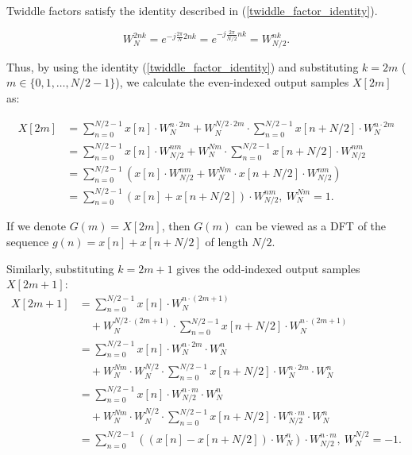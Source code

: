 \documentclass[a4paper,12pt, master]{etf}
\begin{document}
Twiddle factors satisfy the identity described in (\ref{twiddle_factor_identity}).

\begin{equation}
    W_N^{2nk} = e^{-j \frac{2\pi}{N} 2nk} = e^{-j \frac{2\pi}{N/2} nk} = W_{N/2}^{nk}.
\label{twiddle_factor_identity}
\end{equation}

Thus, by using the identity (\ref{twiddle_factor_identity}) and substituting $k=2m$ ($m \in \{0, 1, \ldots, N/2-1\}$), we calculate the even-indexed output samples $X[2m]$ as:

\begin{equation}
\begin{split}
    X[2m] &= \sum_{n=0}^{N/2-1} x[n] \cdot W_N^{n\cdot2m} + W_N^{N/2 \cdot 2m}\cdot\sum_{n=0}^{N/2-1} x[n + N/2] \cdot W_N^{n \cdot 2m} \\
    &= \sum_{n=0}^{N/2-1} x[n] \cdot W_{N/2}^{nm} + W_N^{Nm}\cdot\sum_{n=0}^{N/2-1} x[n + N/2] \cdot W_{N/2}^{nm} \\
    &= \sum_{n=0}^{N/2-1} (x[n] \cdot W_{N/2}^{nm} + W_N^{Nm}\cdot x[n + N/2] \cdot W_{N/2}^{nm}) \\
    &= \sum_{n=0}^{N/2-1} (x[n] + x[n + N/2]) \cdot W_{N/2}^{nm}, \ W_N^{Nm} = 1.
\label{dft_radix2_1}
\end{split}
\end{equation}

If we denote $G(m) = X[2m]$, then $G(m)$ can be viewed as a DFT of the sequence $g(n) = x[n] + x[n + N/2]$ of length $N/2$.

Similarly, substituting $k=2m+1$ gives the odd-indexed output samples $X[2m+1]$:
\begin{equation}
\begin{split}
    X[2m+1] &= \sum_{n=0}^{N/2-1} x[n] \cdot W_N^{n\cdot(2m+1)} \\
    &\quad + W_N^{N/2 \cdot (2m+1)}\cdot\sum_{n=0}^{N/2-1} x[n + N/2] \cdot W_N^{n \cdot (2m+1)} \\
    &= \sum_{n=0}^{N/2-1} x[n] \cdot W_{N}^{n\cdot2m} \cdot W_{N}^{n} \\
    &\quad + W_N^{Nm}\cdot W_N^{N/2} \cdot\sum_{n=0}^{N/2-1} x[n + N/2] \cdot W_{N}^{n\cdot 2m} \cdot W_N^{n} \\
    &= \sum_{n=0}^{N/2-1} x[n] \cdot W_{N/2}^{n\cdot m} \cdot W_{N}^{n} \\
    &\quad + W_N^{Nm}\cdot W_N^{N/2} \cdot\sum_{n=0}^{N/2-1} x[n + N/2] \cdot W_{N/2}^{n\cdot m} \cdot W_N^{n} \\
    &= \sum_{n=0}^{N/2-1} ((x[n] - x[n + N/2]) \cdot W_{N}^{n}) \cdot W_{N/2}^{n\cdot m}, \ W_{N}^{N/2} = -1. \\
\label{dft_radix2_2}
\end{split}
\end{equation}
\end{document}
